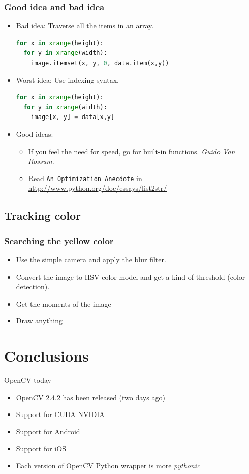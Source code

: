 \documentclass{beamer}
\begin{document}
\begin{frame}[fragile]
  \frametitle{Good idea and bad idea}
    \transdissolve
  \pause
\begin{itemize}
 \item Bad idea: Traverse all the items in an array.
\begin{lstlisting}[language = Python]
for x in xrange(height):
  for y in xrange(width):
    image.itemset(x, y, 0, data.item(x,y))
\end{lstlisting}
  \item Worst idea: Use indexing syntax.
\begin{lstlisting}[language = Python]
for x in xrange(height):
  for y in xrange(width):
    image[x, y] = data[x,y]
\end{lstlisting}
  \item Good ideas:
    \begin{itemize}
     \item If you feel the need for speed, go for built-in functions. \textit{Guido Van Rossum}.
     \item Read \texttt{An Optimization Anecdote} in \url{http://www.python.org/doc/essays/list2str/}
    \end{itemize}
\end{itemize}
\end{frame}

\subsection{Tracking color}
\begin{frame}[fragile]
  \frametitle{Searching the yellow color}
    \transdissolve
    \pause
  \begin{itemize}
   \item Use the simple camera and apply the blur filter.
   \item Convert the image to HSV color model and get a kind of threshold (color detection).
   \item Get the moments of the image
   \item Draw anything
  \end{itemize}
\end{frame}

\section{Conclusions}
\begin{frame}{OpenCV today}
  \begin{itemize}[<+-| alert@+ >]
    \item OpenCV 2.4.2 has been released (two days ago)
    \item Support for CUDA NVIDIA
    \item Support for Android
    \item Support for iOS
    \item Each version of OpenCV Python wrapper is more \textit{pythonic}
  \end{itemize}
\end{frame}
\end{document}
